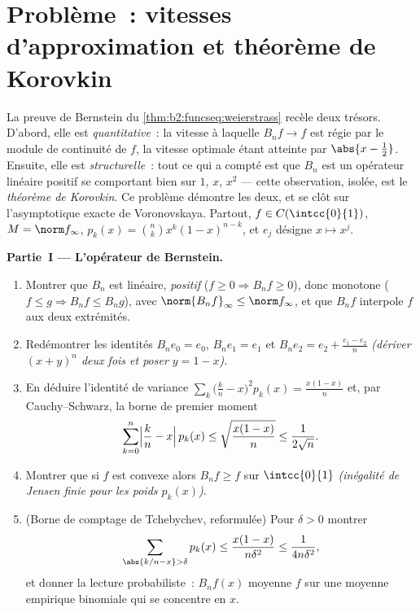 \section{Problème~: vitesses d'approximation et théorème de Korovkin}

\begin{problem}\label{pb:b2:funcseq:1}
La preuve de Bernstein du \cref{thm:b2:funcseq:weierstrass} recèle
deux trésors. D'abord, elle est \emph{quantitative}~: la vitesse à
laquelle $B_nf \to f$ est régie par le module de continuité de $f$,
la vitesse optimale étant atteinte par $\abs{x - \frac12}$. Ensuite,
elle est \emph{structurelle}~: tout ce qui a compté est que $B_n$ est
un opérateur linéaire positif se comportant bien sur $1$, $x$, $x^2$
--- cette observation, isolée, est le \emph{théorème de
Korovkin}. Ce problème démontre les deux,
et se clôt sur l'asymptotique exacte de Voronovskaya. Partout,
$f \in C(\intcc{0}{1})$, $M = \norm f_\infty$, $p_k(x) = \binom
nk x^k(1-x)^{n-k}$, et $e_j$ désigne $x \mapsto x^j$.

\medskip
\noindent\textbf{Partie~I --- L'opérateur de Bernstein.}
\begin{enumerate}
  \item Montrer que $B_n$ est linéaire, \emph{positif} ($f \geq 0
        \Rightarrow B_nf \geq 0$), donc monotone ($f \leq g
        \Rightarrow B_nf \leq B_ng$), avec
        $\norm{B_nf}_\infty \leq \norm f_\infty$, et que
        $B_nf$ interpole $f$ aux deux extrémités.
  \item Redémontrer les identités $B_n e_0 = e_0$, $B_n e_1 =
        e_1$ et $B_n e_2 = e_2 + \frac{e_1 - e_2}{n}$
        \emph{(dériver $(x + y)^n$ deux fois et poser $y = 1 -
        x$)}.
  \item En déduire l'identité de variance $\sum_k \bigl(\frac kn -
        x\bigr)^2 p_k(x) = \frac{x(1-x)}{n}$ et, par
        Cauchy--Schwarz, la borne de premier moment
        \[
        \sum_{k=0}^{n}\Bigl|\frac kn - x\Bigr|\,p_k(x)
        \leq \sqrt{\frac{x(1-x)}{n}} \leq \frac{1}{2\sqrt n} .
        \]
  \item Montrer que si $f$ est convexe alors $B_nf \geq f$ sur
        $\intcc{0}{1}$ \emph{(inégalité de Jensen finie pour les
        poids $p_k(x)$)}.
  \item (Borne de comptage de Tchebychev, reformulée) Pour $\delta > 0$
        montrer
        \[
        \sum_{\abs{k/n - x} > \delta} p_k(x)
        \leq \frac{x(1-x)}{n\delta^2}
        \leq \frac{1}{4n\delta^2} ,
        \]
        et donner la lecture probabiliste~: $B_nf(x)$ moyenne
        $f$ sur une moyenne empirique binomiale qui se concentre en $x$.
\end{enumerate}


\end{problem}

